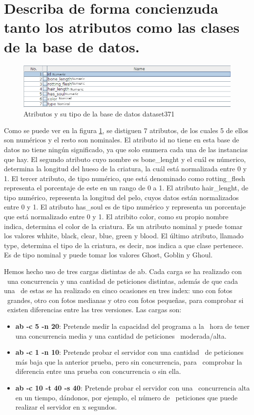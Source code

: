 \documentclass[11pt,twoside,a4paper]{book}
\begin{document}
\section{Describa de forma concienzuda tanto los atributos como las clases de la base de datos.}
\begin{figure}[H]
   \includegraphics[width=\textwidth]{ejercicio4_4.png}
	\caption{Atributos y su tipo de la base de datos dataset371}
	\label{Fig9}
\end{figure}
Como se puede ver en la figura \ref{Fig9}, se distiguen 7 atributos, de los cuales
5 de ellos son numéricos y el resto son nominales. El atributo id no tiene en esta
base de datos no tiene ningún significado, ya que solo enumera cada una de las instancias
que hay. El segundo atributo cuyo nombre es bone\_lenght y el cuál es númerico,
determina la longitud del hueso de la criatura, la cuál está normalizada entre 0
y 1. El tercer atributo, de tipo numérico, que está denominado como rotting\_flesh
representa el porcentaje de este en un rango de 0 a 1.
El atributo hair\_lenght, de tipo numérico, representa la longitud del pelo, cuyos
datos están normalizados entre 0 y 1.
El atributo has\_soul es de tipo numérico y representa un porcentaje que está normalizado
entre 0 y 1. El atribito color, como su propio nombre indica, determina el color
de la criatura. Es un atributo nominal y puede tomar los valores whhite, black, clear,
blue, green y blood.
El último atributo, llamado type, determina el tipo de la criatura, es decir, nos indica
a que clase pertenece. Es de tipo nominal y puede tomar los valores Ghost, Goblin y Ghoul.

Hemos hecho uso de tres cargas distintas de ab. Cada carga se ha realizado con \
una concurrencia y una cantidad de peticiones distintas, además de que cada una \
de estas se ha realizado en cinco ocasiones en tres index: uno con fotos \
grandes, otro con fotos medianas y otro con fotos pequeñas, para comprobar si \
existen diferencias entre las tres versiones. Las cargas son:
\begin{itemize}
  \item \textbf{ab -c 5 -n 20}: Pretende medir la capacidad  del programa a la \
  hora de tener una concurrencia media y una cantidad de peticiones \
  moderada/alta.
  \item \textbf{ab -c 1 -n 10}: Pretende probar el servidor con una cantidad \
  de peticiones más baja que la anterior prueba, pero sin concurrencia, para \
  comprobar la diferencia entre una prueba con concurrencia o sin ella.
  \item \textbf{ab -c 10 -t 40 -s 40}: Pretende probar el servidor con una \
  concurrencia alta en un tiempo, dándonos, por ejemplo, el número de \
  peticiones que puede realizar el servidor en x segundos.
\end{itemize}
\end{document}
